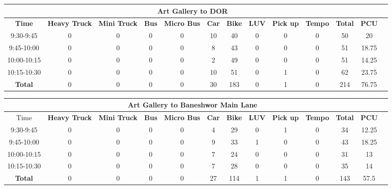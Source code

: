 \begin{landscape}
\centering
\begin{table}[h!]
\centering
\begin{tabular}{|c|c|c|c|c|c|c|c|c|c|c|c|c|}
    \hline
    \multicolumn{12}{|c|}{\textbf{Art Gallery to DOR}} \\
    \hline
    \textbf{Time} & \textbf{Heavy Truck} & \textbf{Mini Truck} & \textbf{Bus} & \textbf{Micro Bus} & \textbf{Car} & \textbf{Bike} & \textbf{LUV} & \textbf{Pick up} & \textbf{Tempo} & \textbf{\textbf{Total}} & \textbf{PCU} \\
    \hline
    9:30-9:45	&0	&0	&0	&0	&10	&40	&0	&0	&0	&50	&20 \\ \hline
    9:45-10:00	&0	&0	&0	&0	&8	&43	&0	&0	&0	&51	&18.75 \\ \hline
    10:00-10:15	&0	&0	&0	&0	&2	&49	&0	&0	&0	&51	&14.25 \\ \hline
    10:15-10:30	&0	&0	&0	&0	&10	&51	&0	&1	&0	&62	&23.75 \\ \hline
    \textbf{Total} & 0 & 0 & 0 & 0 & 30 & 183 & 0 & 1 & 0 & 214 & 76.75 \\ \hline


\end{tabular}

\vspace{0.5cm}

\begin{tabular}{|c|c|c|c|c|c|c|c|c|c|c|c|c|}
    \hline
    \multicolumn{12}{|c|}{\textbf{Art Gallery to Baneshwor Main Lane}} \\
    \hline
        Time & \textbf{Heavy Truck} & \textbf{Mini Truck} & \textbf{Bus} & \textbf{Micro Bus} & \textbf{Car} & \textbf{Bike} & \textbf{LUV} & \textbf{Pick up} & \textbf{Tempo} & \textbf{\textbf{Total}} & \textbf{PCU} \\
    \hline
    9:30-9:45	&0	&0	&0	&0	&4	&29	&0	&1	&0	&34	&12.25 \\ \hline
    9:45-10:00	&0	&0	&0	&0	&9	&33	&1	&0	&0	&43	&18.25 \\ \hline
    10:00-10:15	&0	&0	&0	&0	&7	&24	&0	&0	&0	&31	&13 \\ \hline
    10:15-10:30	&0	&0	&0	&0	&7	&28	&0	&0	&0	&35	&14 \\ \hline
    \textbf{Total} & 0 & 0 & 0 & 0 & 27 & 114 & 1 & 1 & 0 & 143 & 57.5 \\ \hline

\end{tabular}

\vspace{0.5cm}


\end{table}
\end{landscape}
